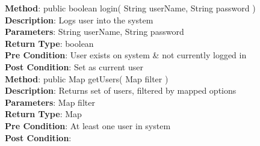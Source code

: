 \documentclass{l3deliverable}
\begin{document}
\textbf{Method}: public boolean login( String userName, String password )\\
\textbf{Description}: Logs user into the system\\
\textbf{Parameters}: String userName, String password\\
\textbf{Return Type}: boolean\\
\textbf{Pre Condition}: User exists on system \& not currently logged in\\
\textbf{Post Condition}: Set as current user\\




\textbf{Method}: public Map getUsers( Map filter )\\
\textbf{Description}: Returns set of users, filtered by mapped options\\
\textbf{Parameters}: Map filter\\
\textbf{Return Type}: Map\\
\textbf{Pre Condition}: At least one user in system\\
\textbf{Post Condition}:\\
\end{document}
